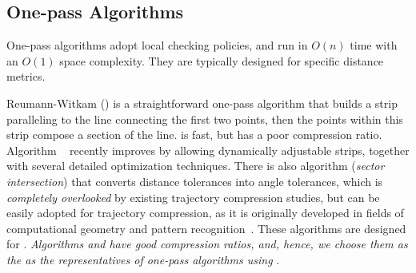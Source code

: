 \subsection{One-pass Algorithms}

One-pass algorithms adopt local checking policies, and run in $O(n)$ time with an $O(1)$ space complexity. They are typically designed for specific distance metrics.

Reumann-Witkam (\rwa) \cite{Reumann:Strip} is a straightforward one-pass algorithm that builds a strip paralleling to the line connecting the first two points, then the points within this strip compose a section of the line.  \rwa is fast, but has a poor compression ratio.
Algorithm \operb~\cite{Lin:Operb} recently improves \rwa  by allowing dynamically adjustable strips, together with several detailed optimization techniques.
%
There is also algorithm \siped (\emph{sector intersection}) that converts distance tolerances into angle tolerances, which is {\em completely overlooked} by existing trajectory compression studies,  but can be easily adopted for trajectory compression, as it is originally developed in fields of computational geometry and pattern recognition~\cite{Williams:Longest,Sklansky:Cone,Dunham:Cone, Zhao:Sleeve}.
These algorithms are designed for \ped. {\em Algorithms \operb and \siped have good compression ratios, and, hence, we choose them as the as the representatives of  one-pass algorithms using \ped}.



%


